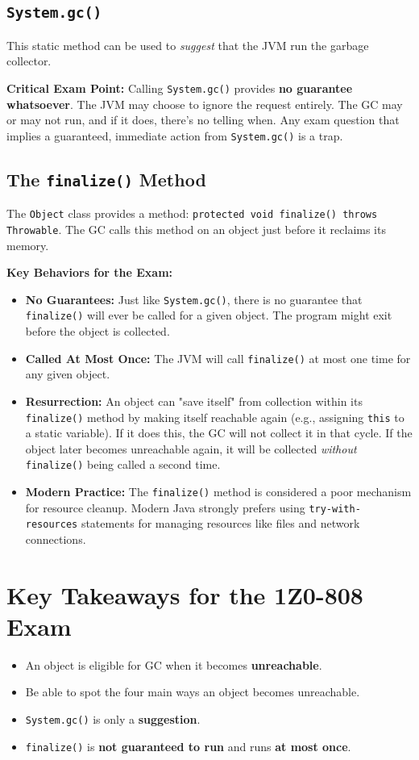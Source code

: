 \documentclass[12pt]{article}
\begin{document}
\begin{enumerate}[label=(\arabic*)]
\subsection*{\texttt{System.gc()}}
This static method can be used to \textit{suggest} that the JVM run the garbage collector. 

\textbf{Critical Exam Point:} Calling \texttt{System.gc()} provides \textbf{no guarantee whatsoever}. The JVM may choose to ignore the request entirely. The GC may or may not run, and if it does, there's no telling when. Any exam question that implies a guaranteed, immediate action from \texttt{System.gc()} is a trap.

\subsection*{The \texttt{finalize()} Method}
The \texttt{Object} class provides a method: \texttt{protected void finalize() throws Throwable}. The GC calls this method on an object just before it reclaims its memory.

\textbf{Key Behaviors for the Exam:}
\begin{itemize}
    \item \textbf{No Guarantees:} Just like \texttt{System.gc()}, there is no guarantee that \texttt{finalize()} will ever be called for a given object. The program might exit before the object is collected.
    \item \textbf{Called At Most Once:} The JVM will call \texttt{finalize()} at most one time for any given object.
    \item \textbf{Resurrection:} An object can "save itself" from collection within its \texttt{finalize()} method by making itself reachable again (e.g., assigning \texttt{this} to a static variable). If it does this, the GC will not collect it in that cycle. If the object later becomes unreachable again, it will be collected \textit{without} \texttt{finalize()} being called a second time.
    \item \textbf{Modern Practice:} The \texttt{finalize()} method is considered a poor mechanism for resource cleanup. Modern Java strongly prefers using \texttt{try-with-resources} statements for managing resources like files and network connections.
\end{itemize}

\section{Key Takeaways for the 1Z0-808 Exam}
\begin{itemize}
    \item An object is eligible for GC when it becomes \textbf{unreachable}.
    \item Be able to spot the four main ways an object becomes unreachable.
    \item \texttt{System.gc()} is only a \textbf{suggestion}.
    \item \texttt{finalize()} is \textbf{not guaranteed to run} and runs \textbf{at most once}.
\end{itemize}
\end{enumerate}
\end{document}
